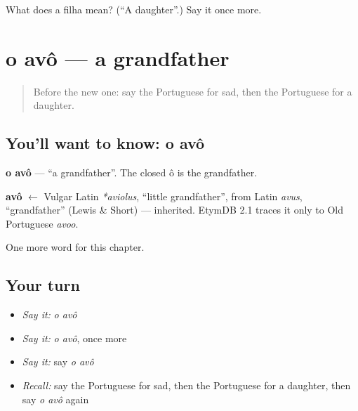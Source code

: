 \begin{tcolorbox}[breakable,colback=teal!4,colframe=teal!35!black,title={Before you move on}]
What does a filha mean? (\textquotedblleft{}A daughter\textquotedblright{}.) Say it once more.
\end{tcolorbox}
\section[o avô]{o avô — a grandfather}

\label{lesson:PT-C37-avo-m}



\begin{quote}
Before the new one: say the Portuguese for sad, then the Portuguese for a daughter.
\end{quote}

\subsection*{You'll want to know: o avô}
\textbf{o avô} — \textquotedblleft{}a grandfather\textquotedblright{}. The closed ô is the grandfather.

\begin{cousinweb}
\textbf{avô} $\leftarrow$ Vulgar Latin \emph{*aviolus}, \textquotedblleft{}little grandfather\textquotedblright{}, from Latin \emph{avus}, \textquotedblleft{}grandfather\textquotedblright{} (Lewis \& Short) — inherited. EtymDB 2.1 traces it only to Old Portuguese \emph{avoo}.
\end{cousinweb}

\begin{grammarlens}[title={What you've built}]
One more word for this chapter.
\end{grammarlens}

\subsection*{Your turn}
\begin{itemize}
\raggedright
  \item \emph{Say it:} \emph{o avô}
  \item \emph{Say it:} \emph{o avô}, once more
  \item \emph{Say it:} say \emph{o avô}
  \item \emph{Recall:} say the Portuguese for sad, then the Portuguese for a daughter, then say \emph{o avô} again
\end{itemize}

